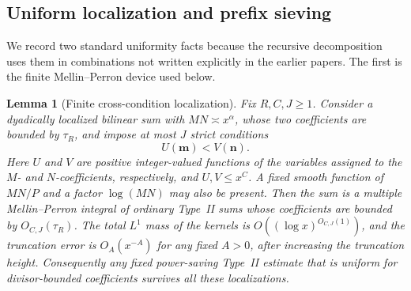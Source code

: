 \documentclass[10pt,reqno]{amsart}
\newcommand{\1}{\mathbf{1}}
\theoremstyle{plain}
\newtheorem{lemma}[theorem]{Lemma}
\theoremstyle{remark}
\begin{document}
\subsection{Uniform localization and prefix sieving}

We record two standard uniformity facts because the recursive decomposition
uses them in combinations not written explicitly in the earlier papers.  The
first is the finite Mellin--Perron device used below.

\begin{lemma}[Finite cross-condition localization]\label{lem:localization}
Fix $R,C,J\ge1$.  Consider a dyadically localized bilinear sum with
$MN\asymp x^\alpha$, whose two coefficients are bounded by $\tau_R$, and
impose at most $J$ strict conditions
\[
 U(\boldsymbol m)<V(\boldsymbol n).
\]
Here $U$ and $V$ are positive integer-valued functions of the variables
assigned to the $M$- and $N$-coefficients, respectively, and
$U,V\le x^C$.  A fixed smooth function of $MN/P$ and a factor $\log(MN)$
may also be present.  Then the sum is a multiple Mellin--Perron integral of
ordinary Type~II sums whose coefficients are bounded by
$O_{C,J}(\tau_R)$.  The total $L^1$ mass of the kernels is
$O((\log x)^{O_{C,J}(1)})$, and the truncation error is $O_A(x^{-A})$
for any fixed $A>0$, after increasing the truncation height.
Consequently any fixed power-saving Type~II estimate that is uniform for
divisor-bounded coefficients survives all these localizations.
\end{lemma}
\end{document}
